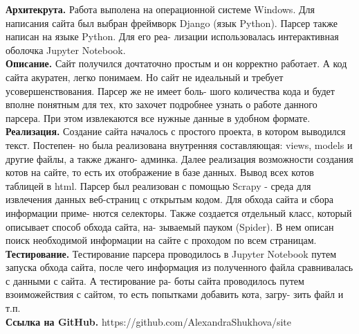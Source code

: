\documentclass[dvipsnames,pdf, unicode, 12pt, a4paper, oneside, fleqn]{article}
\begin{document}

\begin{flushleft}
{\bfseries Архитекрута.} Работа выполена на операционной системе Windows. Для написания сайта был выбран фреймворк Django (язык Python). Парсер также написан на языке Python. Для его реа- лизации использовалась интерактивная оболочка Jupyter Notebook. \\
{\bfseries Описание.} Сайт получился дочтаточно простым и он корректно работает. А код сайта акуратен, легко понимаем. Но сайт не идеальный и требует усовершенствования. Парсер же не имеет боль- шого количества кода и будет вполне понятным для тех, кто захочет подробнее узнать о работе данного парсера. При этом извлекаются все нужные данные в удобном формате.\\
{\bfseries Реализация.} Создание сайта началось с простого проекта, в котором выводился текст. Постепен- но была реализована внутренняя составляющая: views, models и другие файлы, а также джанго- админка. Далее реализация возможности создания котов на сайте, то есть их отображение в базе данных. Вывод всех котов таблицей в html. Парсер был реализован с помощью Scrapy - среда для извлечения данных веб-страниц с открытым кодом. Для обхода сайта и сбора информации приме- нются селекторы. Также создается отдельный класс, который описывает способ обхода сайта, на- зываемый пауком (Spider). В нем описан поиск необходимой информации на сайте с проходом по всем страницам.\\
{\bfseries Тестирование.} Тестирование парсера проводилось в Jupyter Notebook путем запуска обхода сайта, после чего информация из полученного файла сравнивалась с данными с сайта. А тестирование ра- боты сайта проводилось путем взоиможействия с сайтом, то есть попытками добавить кота, загру- зить файл и т.п.\\
{\bfseries Ссылка на GitHub.} https://github.com/AlexandraShukhova/site
\end{flushleft}
\end{document}
